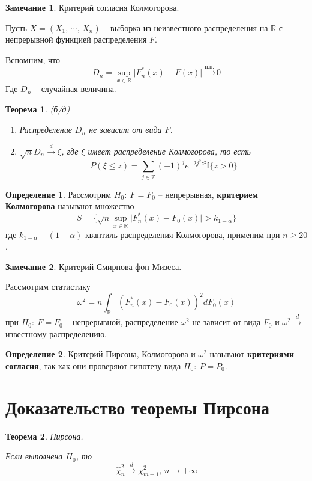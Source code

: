 \documentclass[a4paper,12pt]{article}
\renewcommand{\leq}{\ensuremath{\leqslant}}
\renewcommand{\geq}{\ensuremath{\geqslant}}
\theoremstyle{plain}
\newtheorem{theorem}{Теорема}[section]
\theoremstyle{definition}
\newtheorem{definition}{Определение}[section]
\newtheorem*{note}{Замечание}
\theoremstyle{remark}
\begin{document}
\begin{note}
  Критерий согласия Колмогорова.

  Пусть $X = (X_1,\,\cdots,\,X_n)$ -- выборка из неизвестного распределения на $\mathbb{R}$ с непрерывной функцией распределения $F$.

  Вспомним, что
  \[
    D_n = \sup_{x \in \mathbb{R}}\vert F_n^*(x) - F(x)\vert \overset{\text{п.н.}}{\to} 0
  \]
  Где $D_n$ -- случайная величина.
\end{note}

\begin{theorem}
  (б/д)

  \begin{enumerate}
    \item Распределение $D_n$ не зависит от вида $F$.
    \item $\sqrt{n}D_n \overset{d}{\to} \xi$, где $\xi$ имеет распределение Колмогорова, то есть
    \[
      P(\xi \leq z) = \sum_{j \in \mathbb{Z}}(-1)^je^{-2j^2z^2}\mathbb{I}\{z > 0\}
    \]
  \end{enumerate}
\end{theorem}

\begin{definition}
  Рассмотрим $H_0 :\: F = F_0$ -- непрерывная, \textbf{критерием Колмогорова} называют множество
  \[
    S = \{\sqrt{n}\sup_{x \in \mathbb{R}}\vert F_n^*(x) - F_0(x)\vert > k_{1 - \alpha}\}
  \]
  где $k_{1 - \alpha}$ -- $(1 - \alpha)$-квантиль распределения Колмогорова, применим при $n \geq 20$.
\end{definition}

\begin{note}
  Критерий Смирнова-фон Мизеса.

  Рассмотрим статистику
  \[
    \omega^2 = n\int_\mathbb{R}(F_n^*(x) - F_0(x))^2dF_0(x)
  \]
  при $H_0 :\: F = F_0$ -- непрерывной, распределение $\omega^2$ не зависит от вида $F_0$ и $\omega^2 \overset{d}{\to} $известному распределению.
\end{note}

\begin{definition}
  Критерий Пирсона, Колмогорова и $\omega^2$ называют \textbf{критериями согласия}, так как они проверяют гипотезу вида $H_0 :\: P = P_0$.
\end{definition}

\section{Доказательство теоремы Пирсона}
\begin{theorem}
  Пирсона.

  Если выполнена $H_0$, то 
  \[
    \hat{\chi}^2_n \overset{d}{\to} \chi^2_{m - 1},\, n \to +\infty
  \]
\end{theorem}
\end{document}
